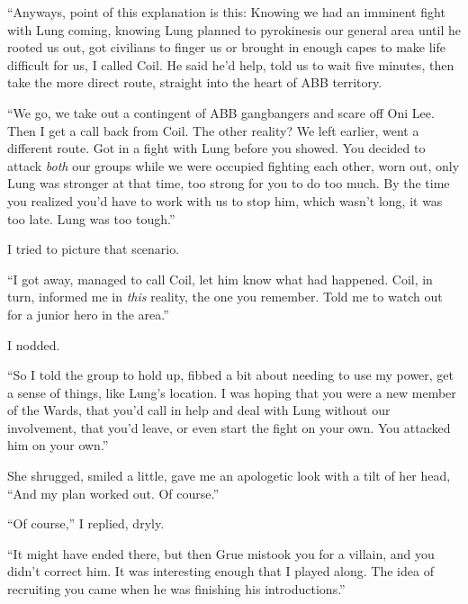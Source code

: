 ``Anyways, point of this explanation is this:  Knowing we had an imminent fight with Lung coming, knowing Lung planned to pyrokinesis our general area until he rooted us out, got civilians to finger us or brought in enough capes to make life difficult for us, I called Coil.  He said he'd help, told us to wait five minutes, then take the more direct route, straight into the heart of ABB territory.



``We go, we take out a contingent of ABB gangbangers and scare off Oni Lee.  Then I get a call back from Coil.  The other reality?  We left earlier, went a different route.  Got in a fight with Lung before you showed.  You decided to attack \emph{both} our groups while we were occupied fighting each other, worn out, only Lung was stronger at that time, too strong for you to do too much.  By the time you realized you'd have to work with us to stop him, which wasn't long, it was too late.  Lung was too tough.''



I tried to picture that scenario.



``I got away, managed to call Coil, let him know what had happened.  Coil, in turn, informed me in \emph{this} reality, the one you remember.  Told me to watch out for a junior hero in the area.''



I nodded.



``So I told the group to hold up, fibbed a bit about needing to use my power, get a sense of things, like Lung's location.  I was hoping that you were a new member of the Wards, that you'd call in help and deal with Lung without our involvement, that you'd leave, or even start the fight on your own.  You attacked him on your own.''



She shrugged, smiled a little, gave me an apologetic look with a tilt of her head, ``And my plan worked out.  Of course.''



``Of course,'' I replied, dryly.



``It might have ended there, but then Grue mistook you for a villain, and you didn't correct him.  It was interesting enough that I played along.  The idea of recruiting you came when he was finishing his introductions.''



